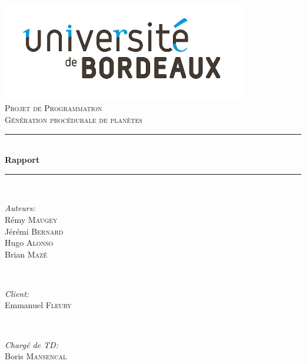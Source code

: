 \documentclass[12pt]{report}
\begin{document}
  
  
  \newcommand{\source}[1]{\caption*{Source: {#1}} }
  
  
  \begin{titlepage}
  
  \newcommand{\HRule}{\rule{\linewidth}{0.7mm}} %
  
  \center
   
  \includegraphics[width=0.8\textwidth]{img/logo.jpg}\\
  
  \textsc{\Large Projet de Programmation}\\[0.5cm]
  \textsc{\large Génération procédurale de planètes}\\[0.5cm]
  
  
  \HRule \\[0.4cm]
  { \huge \bfseries Rapport}\\[0.4cm]
  \HRule \\[1.5cm]
   
  
  \begin{minipage}{0.4\textwidth}
  \begin{flushleft} \large
  \emph{Auteurs:}\\
  Rémy \textsc{Maugey}\\
  Jérémi \textsc{Bernard}\\
  Hugo \textsc{Alonso}\\
  Brian \textsc{Mazé}\\
  \end{flushleft}
  \end{minipage}
  ~
  \begin{minipage}{0.4\textwidth}
  \begin{flushright} \large
  \emph{Client:} \\
  Emmanuel \textsc{Fleury}
  \end{flushright}
  ~
  \begin{flushright} \large
  \emph{Chargé de TD:} \\
  Boris \textsc{Mansencal}
  \end{flushright}
  \end{minipage}\\[2cm]
  

\end{titlepage}
\end{document}
